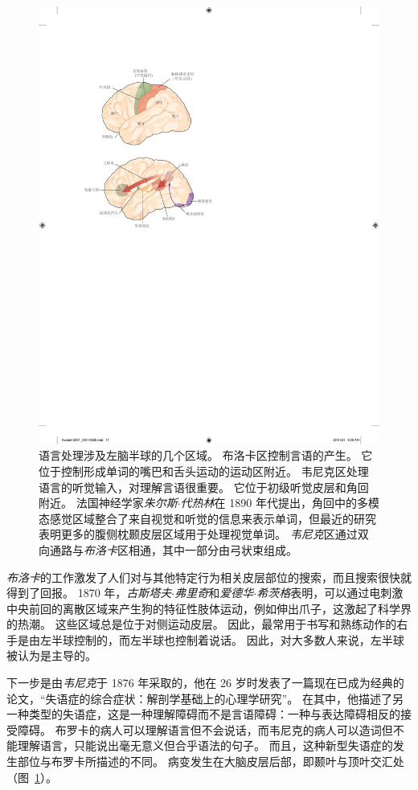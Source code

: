 \begin{figure}[htbp]
	\centering
	\includegraphics[width=0.6\linewidth]{chap01/fig_1_6}
	\caption{语言处理涉及左脑半球的几个区域。
		布洛卡区控制言语的产生。
		它位于控制形成单词的嘴巴和舌头运动的运动区附近。
		韦尼克区处理语言的听觉输入，对理解言语很重要。
		它位于初级听觉皮层和角回附近。
		法国神经学家\textit{朱尔斯$\cdot$代热林}在 1890 年代提出，角回中的多模态感觉区域整合了来自视觉和听觉的信息来表示单词，但最近的研究表明更多的腹侧枕颞皮层区域用于处理视觉单词。
		\textit{韦尼克}区通过双向通路与\textit{布洛卡}区相通，其中一部分由弓状束组成\cite{geschwind1979specializations}。}
	\label{fig:1_6}
\end{figure}


\textit{布洛卡}的工作激发了人们对与其他特定行为相关皮层部位的搜索，而且搜索很快就得到了回报。
1870 年，\textit{古斯塔夫$\cdot$弗里奇}和\textit{爱德华$\cdot$希茨格}表明，可以通过电刺激中央前回的离散区域来产生狗的特征性肢体运动，例如伸出爪子，这激起了科学界的热潮。
这些区域总是位于对侧运动皮层。
因此，最常用于书写和熟练动作的右手是由左半球控制的，而左半球也控制着说话。
因此，对大多数人来说，左半球被认为是主导的。


下一步是由\textit{韦尼克}于 1876 年采取的，他在 26 岁时发表了一篇现在已成为经典的论文，“失语症的综合症状：解剖学基础上的心理学研究”。
在其中，他描述了另一种类型的失语症，这是一种理解障碍而不是言语障碍：一种与表达障碍相反的接受障碍。
布罗卡的病人可以理解语言但不会说话，而韦尼克的病人可以造词但不能理解语言，只能说出毫无意义但合乎语法的句子。
而且，这种新型失语症的发生部位与布罗卡所描述的不同。
病变发生在大脑皮层后部，即颞叶与顶叶交汇处（图~\ref{fig:1_6}）。


